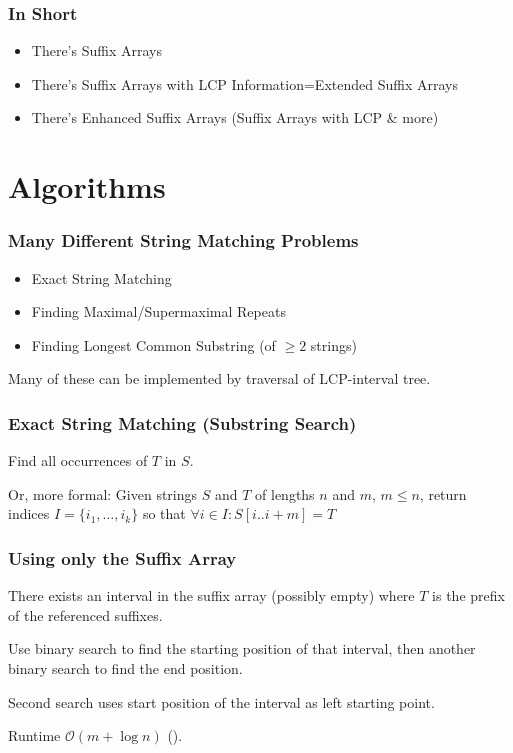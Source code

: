 \documentclass[compress,handout]{beamer} %
\renewcommand{\O}{\mathcal{O}}
\begin{document}
\begin{frame}
	\frametitle{In Short}
	\begin{itemize}
		\item There's Suffix Arrays
		\item There's Suffix Arrays with LCP Information=Extended Suffix Arrays
		\item There's Enhanced Suffix Arrays (Suffix Arrays with LCP \& more)
	\end{itemize}
\end{frame}

\section{Algorithms}

\begin{frame}
	\frametitle{Many Different String Matching Problems}
	\begin{itemize}
		\item Exact String Matching
		\item Finding Maximal/Supermaximal Repeats
		\item Finding Longest Common Substring (of $\ge 2$ strings)
	\end{itemize}
	Many of these can be implemented by traversal of LCP-interval tree.
\end{frame}

\begin{frame}
	\frametitle{Exact String Matching (Substring Search)}
	Find all occurrences of $T$ in $S$.

	Or, more formal: Given strings $S$ and $T$ of lengths $n$ and
	$m$, $m \le n$, return indices $I=\{i_{1}, \ldots, i_{k}\}$
	so that $\forall i \in I: S[i..i+m]=T$
\end{frame}

\begin{frame}
	\frametitle{Using only the Suffix Array}
	There exists an interval in the suffix array (possibly empty)
	where $T$ is the prefix of the referenced suffixes.

	Use binary search to find the starting position of that interval,
	then another binary search to find the end position.

	Second search uses start position of the interval as left
	starting point.

	Runtime $\O(m + \log n)$ (\cite{manber1993suffix}).
\end{frame}
\end{document}
